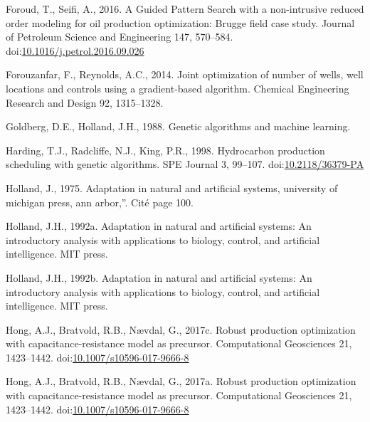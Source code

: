 \documentclass[]{elsarticle} %
\newlength{\cslhangindent}
\newenvironment{CSLReferences}[2] %
 {%
  \setlength{\parindent}{0pt}
  \ifodd #1 \everypar{\setlength{\hangindent}{\cslhangindent}}\ignorespaces\fi
  \ifnum #2 > 0
  \setlength{\parskip}{#2\baselineskip}
  \fi
 }%
 {}
\begin{document}
\begin{CSLReferences}{1}{0}
\leavevmode{}%
Foroud, T., Seifi, A., 2016. A Guided Pattern Search with a non-intrusive reduced order modeling for oil production optimization: Brugge field case study. Journal of Petroleum Science and Engineering 147, 570--584. doi:\href{https://doi.org/10.1016/j.petrol.2016.09.026}{10.1016/j.petrol.2016.09.026}

\leavevmode{}%
Forouzanfar, F., Reynolds, A.C., 2014. Joint optimization of number of wells, well locations and controls using a gradient-based algorithm. Chemical Engineering Research and Design 92, 1315--1328.

\leavevmode{}%
Goldberg, D.E., Holland, J.H., 1988. Genetic algorithms and machine learning.

\leavevmode{}%
Harding, T.J., Radcliffe, N.J., King, P.R., 1998. Hydrocarbon production scheduling with genetic algorithms. SPE Journal 3, 99--107. doi:\href{https://doi.org/10.2118/36379-PA}{10.2118/36379-PA}

\leavevmode{}%
Holland, J., 1975. Adaptation in natural and artificial systems, university of michigan press, ann arbor,{''}. Cité page 100.

\leavevmode{}%
Holland, J.H., 1992a. Adaptation in natural and artificial systems: An introductory analysis with applications to biology, control, and artificial intelligence. MIT press.

\leavevmode{}%
Holland, J.H., 1992b. Adaptation in natural and artificial systems: An introductory analysis with applications to biology, control, and artificial intelligence. MIT press.

\leavevmode{}%
Hong, A.J., Bratvold, R.B., Nævdal, G., 2017c. Robust production optimization with capacitance-resistance model as precursor. Computational Geosciences 21, 1423--1442. doi:\href{https://doi.org/10.1007/s10596-017-9666-8}{10.1007/s10596-017-9666-8}

\leavevmode{}%
Hong, A.J., Bratvold, R.B., Nævdal, G., 2017a. Robust production optimization with capacitance-resistance model as precursor. Computational Geosciences 21, 1423--1442. doi:\href{https://doi.org/10.1007/s10596-017-9666-8}{10.1007/s10596-017-9666-8}


\end{CSLReferences}
\end{document}
